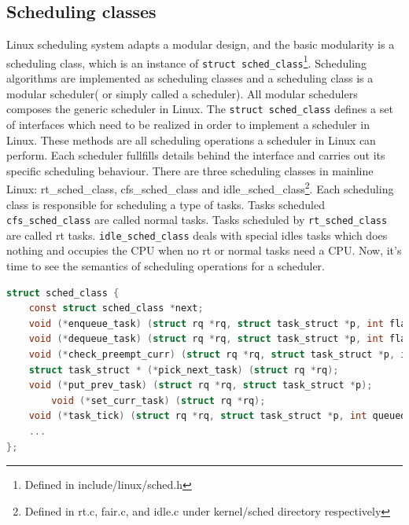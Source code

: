 \subsection{Scheduling classes\label{sec:LinuxSched_classes}}
Linux scheduling system adapts a modular design, and the basic modularity is
a scheduling class, which is an instance of 
\texttt{struct sched\_class}\footnote{Defined in include/linux/sched.h}. 
Scheduling algorithms are implemented as scheduling classes and a 
scheduling class is a modular scheduler( or simply called a scheduler).
All modular schedulers composes the generic scheduler in Linux.
The \texttt{struct sched\_class} defines a set of interfaces which need to be 
realized in order to implement a scheduler in Linux. These methods are all 
scheduling operations a scheduler in Linux can perform. Each scheduler 
fullfills details behind the interface and carries out its specific
scheduling behaviour. 
There are three scheduling classes in mainline Linux: rt\_sched\_class,
cfs\_sched\_class and idle\_sched\_class\footnote{Defined in rt.c, fair.c, 
and idle.c under kernel/sched directory respectively}. Each scheduling class is 
responsible for scheduling a type of tasks. Tasks scheduled
\texttt{cfs\_sched\_class} are called normal tasks. Tasks scheduled
by \texttt{rt\_sched\_class} are called rt tasks. 
\texttt{idle\_sched\_class} deals with special idles tasks which
does nothing and occupies the CPU when no rt or normal tasks need a CPU.
Now, it's time to see the semantics of scheduling operations for a scheduler.
\begin{lstlisting}[language=C, 
		caption={\texttt{Shceduling operations for a scheduler}},
		label={sched_class}]
struct sched_class {
	const struct sched_class *next;
	void (*enqueue_task) (struct rq *rq, struct task_struct *p, int flags);
	void (*dequeue_task) (struct rq *rq, struct task_struct *p, int flags);
	void (*check_preempt_curr) (struct rq *rq, struct task_struct *p, int flags);
	struct task_struct * (*pick_next_task) (struct rq *rq);
	void (*put_prev_task) (struct rq *rq, struct task_struct *p);
        void (*set_curr_task) (struct rq *rq);
	void (*task_tick) (struct rq *rq, struct task_struct *p, int queued);
	...
};
\end{lstlisting}
